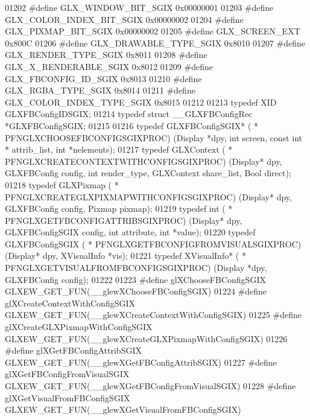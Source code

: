 \begin{DoxyCode}
01202 \textcolor{preprocessor}{#define GLX\_WINDOW\_BIT\_SGIX 0x00000001}
01203 \textcolor{preprocessor}{#define GLX\_COLOR\_INDEX\_BIT\_SGIX 0x00000002}
01204 \textcolor{preprocessor}{#define GLX\_PIXMAP\_BIT\_SGIX 0x00000002}
01205 \textcolor{preprocessor}{#define GLX\_SCREEN\_EXT 0x800C}
01206 \textcolor{preprocessor}{#define GLX\_DRAWABLE\_TYPE\_SGIX 0x8010}
01207 \textcolor{preprocessor}{#define GLX\_RENDER\_TYPE\_SGIX 0x8011}
01208 \textcolor{preprocessor}{#define GLX\_X\_RENDERABLE\_SGIX 0x8012}
01209 \textcolor{preprocessor}{#define GLX\_FBCONFIG\_ID\_SGIX 0x8013}
01210 \textcolor{preprocessor}{#define GLX\_RGBA\_TYPE\_SGIX 0x8014}
01211 \textcolor{preprocessor}{#define GLX\_COLOR\_INDEX\_TYPE\_SGIX 0x8015}
01212 
01213 \textcolor{keyword}{typedef} XID GLXFBConfigIDSGIX;
01214 \textcolor{keyword}{typedef} \textcolor{keyword}{struct }\_\_GLXFBConfigRec *GLXFBConfigSGIX;
01215 
01216 \textcolor{keyword}{typedef} GLXFBConfigSGIX* ( * PFNGLXCHOOSEFBCONFIGSGIXPROC) (Display *dpy, \textcolor{keywordtype}{int} screen, \textcolor{keyword}{const} \textcolor{keywordtype}{int} *
      attrib\_list, \textcolor{keywordtype}{int} *nelements);
01217 \textcolor{keyword}{typedef} GLXContext ( * PFNGLXCREATECONTEXTWITHCONFIGSGIXPROC) (Display* dpy, GLXFBConfig config, \textcolor{keywordtype}{int} 
      render\_type, GLXContext share\_list, Bool direct);
01218 \textcolor{keyword}{typedef} GLXPixmap ( * PFNGLXCREATEGLXPIXMAPWITHCONFIGSGIXPROC) (Display* dpy, GLXFBConfig config, Pixmap 
      pixmap);
01219 \textcolor{keyword}{typedef} int ( * PFNGLXGETFBCONFIGATTRIBSGIXPROC) (Display* dpy, GLXFBConfigSGIX config, \textcolor{keywordtype}{int} attribute, \textcolor{keywordtype}{int} 
      *value);
01220 \textcolor{keyword}{typedef} GLXFBConfigSGIX ( * PFNGLXGETFBCONFIGFROMVISUALSGIXPROC) (Display* dpy, XVisualInfo *vis);
01221 \textcolor{keyword}{typedef} XVisualInfo* ( * PFNGLXGETVISUALFROMFBCONFIGSGIXPROC) (Display *dpy, GLXFBConfig config);
01222 
01223 \textcolor{preprocessor}{#define glXChooseFBConfigSGIX GLXEW\_GET\_FUN(\_\_glewXChooseFBConfigSGIX)}
01224 \textcolor{preprocessor}{#define glXCreateContextWithConfigSGIX GLXEW\_GET\_FUN(\_\_glewXCreateContextWithConfigSGIX)}
01225 \textcolor{preprocessor}{#define glXCreateGLXPixmapWithConfigSGIX GLXEW\_GET\_FUN(\_\_glewXCreateGLXPixmapWithConfigSGIX)}
01226 \textcolor{preprocessor}{#define glXGetFBConfigAttribSGIX GLXEW\_GET\_FUN(\_\_glewXGetFBConfigAttribSGIX)}
01227 \textcolor{preprocessor}{#define glXGetFBConfigFromVisualSGIX GLXEW\_GET\_FUN(\_\_glewXGetFBConfigFromVisualSGIX)}
01228 \textcolor{preprocessor}{#define glXGetVisualFromFBConfigSGIX GLXEW\_GET\_FUN(\_\_glewXGetVisualFromFBConfigSGIX)}

\end{DoxyCode}
